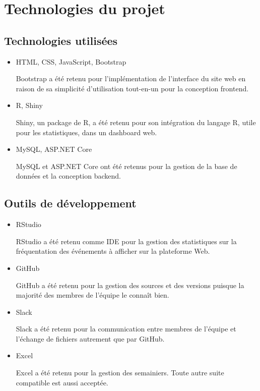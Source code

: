 \documentclass[letter,12pt]{exam}
\begin{document}
\section{Technologies du projet}

\subsection{Technologies utilisées}

\begin{itemize}
\tightlist
\item
  HTML, CSS, JavaScript, Bootstrap

  Bootstrap a été retenu pour l'implémentation de l'interface du site web en raison de sa simplicité d'utilisation tout-en-un pour la conception frontend.
\item
  R, Shiny

  Shiny, un package de R, a été retenu pour son intégration du langage R, utile pour les statistiques, dans un dashboard web.
\item
  MySQL, ASP.NET Core

  MySQL et ASP.NET Core ont été retenus pour la gestion de la base de données et la conception backend.
\end{itemize}

\subsection{Outils de développement}

\begin{itemize}

\item
  RStudio

  RStudio a été retenu comme IDE pour la gestion des statistiques sur la fréquentation des événements à afficher sur la plateforme Web.

\item
  GitHub

  GitHub a été retenu pour la gestion des sources et des versions puisque la majorité des membres de l'équipe le connaît bien.

\item
  Slack

  Slack a été retenu pour la communication entre membres de l'équipe et l'échange de fichiers autrement que par GitHub.
\item
  Excel

  Excel a été retenu pour la gestion des semainiers. Toute autre suite compatible est aussi acceptée.

\end{itemize}
\end{document}
